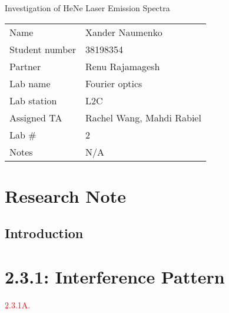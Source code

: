 \documentclass[letterpaper, reqno,11pt]{article}
\begin{document}
\begin{titlepage}
\centering


\Large Investigation of HeNe Laser Emission Spectra

\normalsize




\begin{tabular}{ll}
Name & Xander Naumenko \\[2ex]
Student number & 38198354 \\[2ex]
Partner & Renu Rajamagesh \\[2ex]
Lab name & Fourier optics \\[2ex]
Lab station  & L2C \\[2ex]
Assigned TA            & Rachel Wang, Mahdi Rabiel \\[2ex]
Lab \#            & 2 \\[2ex]
Notes &  N/A
\end{tabular}


\begin{abstract}
\end{abstract}

\end{titlepage}

\newpage

\section{Research Note}

\subsection{Introduction}


\newpage

\section{2.3.1: Interference Pattern}

\noindent \textcolor{red}{2.3.1A.} 
\end{document}
